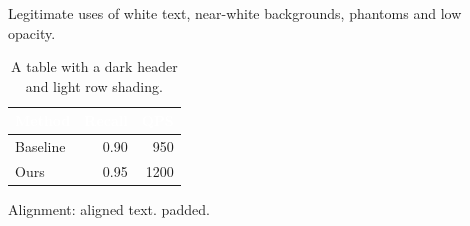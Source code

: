 \documentclass{article}
\begin{document}
Legitimate uses of white text, near-white backgrounds, phantoms and low opacity.
\begin{table}[h]
\centering
\begin{tabular}{lrr}
\toprule
\rowcolor{header}\textcolor{white}{\textbf{Method}} & \textcolor{white}{\textbf{Recall}} & \textcolor{white}{\textbf{QPS}} \\
\midrule
\rowcolor{tabbg} Baseline & 0.90 & \phantom{0}950 \\
Ours & 0.95 & 1200 \\
\bottomrule
\end{tabular}
\caption{A table with a dark header and light row shading.}
\end{table}
Alignment: \phantom{Baseline method}aligned text. \hphantom{000}padded.
\end{document}
